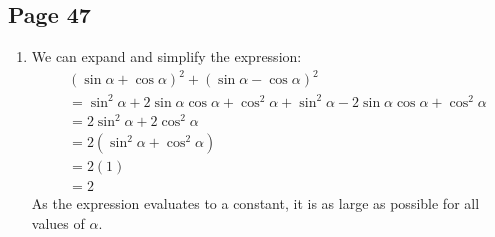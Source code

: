 \documentclass{article}
\newenvironment{solutions}[1]
{\subsection*{#1}
 \begin{enumerate}[leftmargin=1.5em]}
{\end{enumerate}}
\newcommand{\solution}{\item}
\begin{document}
\begin{solutions}{Page 47}
\solution %
We can expand and simplify the expression:
\begin{align*}
& (\sin{\alpha} + \cos{\alpha})^2 + (\sin{\alpha} - \cos{\alpha})^2 \\
&= \sin^{2}{\alpha} + 2\sin{\alpha}\cos{\alpha} + \cos^{2}{\alpha} + \sin^{2}{\alpha} - 2\sin{\alpha}\cos{\alpha} + \cos^{2}{\alpha} \\
&= 2\sin^{2}{\alpha} + 2\cos^{2}{\alpha} \\
&= 2(\sin^{2}{\alpha} + \cos^{2}{\alpha}) \\
&= 2(1) \\
&= 2
\end{align*}
As the expression evaluates to a constant, it is as large as possible for all values of $\alpha$.

\end{solutions}
\end{document}
